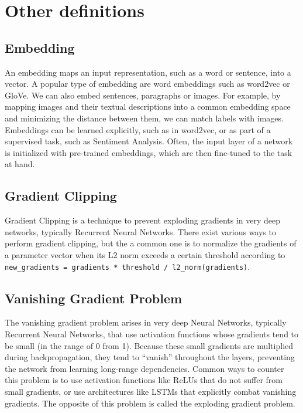 \chapter{Other definitions}

\section{Embedding}
An embedding maps an input representation, such as a word or sentence, into a vector. A popular type of embedding are word embeddings such as word2vec or GloVe. We can also embed sentences, paragraphs or images. For example, by mapping images and their textual descriptions into a common embedding space and minimizing the distance between them, we can match labels with images. Embeddings can be learned explicitly, such as in word2vec, or as part of a supervised task, such as Sentiment Analysis. Often, the input layer of a network is initialized with pre-trained embeddings, which are then fine-tuned to the task at hand.

\section{Gradient Clipping}
Gradient Clipping is a technique to prevent exploding gradients in very deep networks, typically Recurrent Neural Networks. There exist various ways to perform gradient clipping, but the a common one is to normalize the gradients of a parameter vector when its L2 norm exceeds a certain threshold according to \texttt{new\_gradients = gradients * threshold / l2\_norm(gradients)}.

\section{Vanishing Gradient Problem}

The vanishing gradient problem arises in very deep Neural Networks, typically Recurrent Neural Networks, that use activation functions whose gradients tend to be small (in the range of 0 from 1). Because these small gradients are multiplied during backpropagation, they tend to “vanish” throughout the layers, preventing the network from learning long-range dependencies. Common ways to counter this problem is to use activation functions like ReLUs that do not suffer from small gradients, or use architectures like LSTMs that explicitly combat vanishing gradients. The opposite of this problem is called the exploding gradient problem.